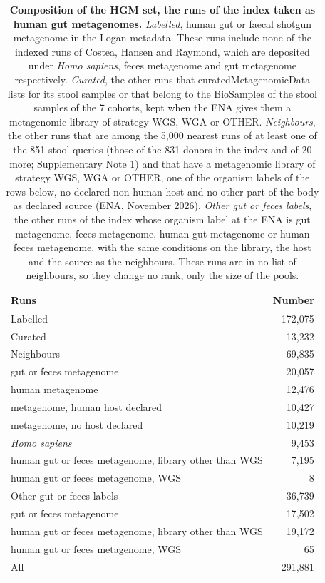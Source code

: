 \documentclass[11pt,a4paper]{article}
\begin{document}
\setcounter{table}{2}
\begin{table}[!htbp]\centering\small
\caption[Composition of the HGM set, the runs of the index taken as human gut metagenomes]{\textbf{Composition of the HGM set, the runs of the index taken as human gut metagenomes.} \textit{Labelled}, human gut or faecal shotgun metagenome in the Logan metadata. These runs include none of the indexed runs of Costea, Hansen and Raymond, which are deposited under \textit{Homo sapiens}, feces metagenome and gut metagenome respectively. \textit{Curated}, the other runs that curatedMetagenomicData lists for its stool samples or that belong to the BioSamples of the stool samples of the 7 cohorts, kept when the ENA gives them a metagenomic library of strategy WGS, WGA or OTHER. \textit{Neighbours}, the other runs that are among the 5,000 nearest runs of at least one of the 851 stool queries (those of the 831 donors in the index and of 20 more; Supplementary Note 1) and that have a metagenomic library of strategy WGS, WGA or OTHER, one of the organism labels of the rows below, no declared non-human host and no other part of the body as declared source (ENA, November 2026). \textit{Other gut or feces labels}, the other runs of the index whose organism label at the ENA is gut metagenome, feces metagenome, human gut metagenome or human feces metagenome, with the same conditions on the library, the host and the source as the neighbours. These runs are in no list of neighbours, so they change no rank, only the size of the pools.}
\begin{tabular}{lr}
\toprule
Runs & Number \\
\midrule
Labelled & 172,075 \\
Curated & 13,232 \\
Neighbours & 69,835 \\
\quad gut or feces metagenome & 20,057 \\
\quad human metagenome & 12,476 \\
\quad metagenome, human host declared & 10,427 \\
\quad metagenome, no host declared & 10,219 \\
\quad \textit{Homo sapiens} & 9,453 \\
\quad human gut or feces metagenome, library other than WGS & 7,195 \\
\quad human gut or feces metagenome, WGS & 8 \\
Other gut or feces labels & 36,739 \\
\quad gut or feces metagenome & 17,502 \\
\quad human gut or feces metagenome, library other than WGS & 19,172 \\
\quad human gut or feces metagenome, WGS & 65 \\
\midrule
All & 291,881 \\
\bottomrule
\end{tabular}
\end{table}
\end{document}
